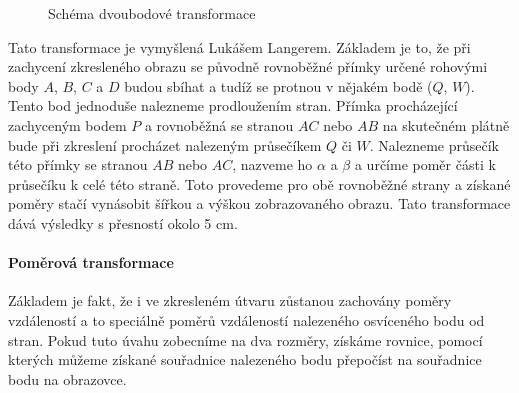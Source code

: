\documentclass[twoside,12pt]{article}
\newcommand{\podpodsekce}[1]{\paragraph{#1}\quad\vskip 6pt}
\begin{document}
\begin{figure}[ht]
 \begin{center}
 \end{center}
 \caption{Schéma dvoubodové transformace}
\end{figure}
Tato transformace je vymyšlená Lukášem Langerem. Základem je to, že při zachycení zkresleného obrazu se původně rovnoběžné přímky určené rohovými body $A$, $B$, $C$ a $D$ budou sbíhat a tudíž se protnou v nějakém bodě ($Q$, $W$). Tento bod jednoduše nalezneme prodloužením stran. Přímka procházející zachyceným bodem $P$ a rovnoběžná se stranou  $AC$ nebo $AB$ na skutečném plátně bude při zkreslení procházet nalezeným průsečíkem $Q$ či $W$. Nalezneme průsečík této přímky se stranou $AB$ nebo $AC$, nazveme ho $\alpha$ a $\beta$ a určíme poměr části k průsečíku k celé této straně. Toto provedeme pro obě rovnoběžné strany a získané poměry stačí vynásobit šířkou a výškou zobrazovaného obrazu. Tato transformace dává výsledky s přesností okolo 5 cm.

\podpodsekce{ Poměrová transformace}

Základem je fakt, že i ve zkresleném útvaru zůstanou zachovány poměry vzdáleností a to speciálně poměrů vzdáleností nalezeného osvíceného bodu od stran. Pokud tuto úvahu zobecníme na dva rozměry, získáme rovnice, pomocí kterých můžeme získané souřadnice nalezeného bodu přepočíst na souřadnice bodu na obrazovce.
\end{document}
